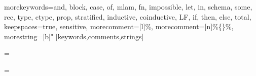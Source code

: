 \usepackage{color}
\usepackage{xspace}
\usepackage{listings}


{
  morekeywords={and, block, case, of, mlam, fn, impossible, let, in, schema,
    some, rec, type, ctype, prop, stratified, inductive, coinductive, LF, if, then,
    else, total},
  keepspaces=true,
  sensitive,
  morecomment=[l]{\%},
  morecomment=[n]{\%\{}{\}\%},
  morestring=[b]"
}[keywords,comments,strings]

\lstset{language=ContextualML}

\newdimen\zzlistingsize
\newdimen\zzlistingsizedefault
\zzlistingsizedefault=10pt
\zzlistingsize=\zzlistingsizedefault
\global\def\CommentCopter{0}
\newcommand{\Lstbasicstyle}{\fontsize{\zzlistingsize}{1.05\zzlistingsize}\ttfamily%
}
\newcommand{\keywordcopter}{\fontsize{0.95\zzlistingsize}{1.0\zzlistingsize}\bf}
\newcommand{\stupidcopter}{\if0\CommentCopter\keywordcopter\fi}
\newcommand{\commentcopter}{\def\CommentCopter{1}\fontsize{0.95\zzlistingsize}{1.0\zzlistingsize}\rmfamily\slshape}

\newcommand{\caret}{\char94}

\newcommand{\LST}{\setlistingsize{\zzlistingsizedefault}}

\newlength{\zzlstwidth}
\newcommand{\setlistingsize}[1]{\zzlistingsize=#1%
\settowidth{\zzlstwidth}{{\Lstbasicstyle~}}%
}
\setlistingsize{\zzlistingsizedefault}


